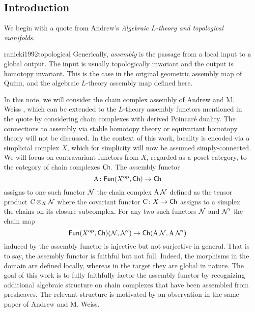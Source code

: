 
\subsection{Introduction}\label{ss:introduction}

We begin with a quote from Andrew's \textit{Algebraic $L$-theory and topological manifolds}.
\begin{displaycquote}{ranicki1992topological}
	Generically, \textit{assembly} is the passage from a local input to a global output.
	The input is usually topologically invariant and the output is homotopy invariant.
	This is the case in the original geometric assembly map of Quinn, and the algebraic $L$-theory assembly map defined here.
\end{displaycquote}
In this note, we will consider the chain complex assembly of Andrew and M. Weiss \cite{ranicki1990assembly}, which can be extended to the $L$-theory assembly functors mentioned in the quote by considering chain complexes with derived Poincar\'e duality.
The connections to assembly via stable homotopy theory \cite{weiss1995asssembly} or equivariant homotopy theory \cite{davis1998assembly} will not be discussed.
In the context of this work, locality is encoded via a simplicial complex $X$, which for simplicity will now be assumed simply-connected.
We will focus on contravariant functors from $X$, regarded as a poset category, to the category of chain complexes $\mathsf{Ch}$.
The assembly functor
\[
\operatorname{A} \colon \mathsf{Fun}(X^{\mathrm{op}}, \mathsf{Ch}) \to \mathsf{Ch}
\]
assigns to one such functor $\mathcal{N}$ the chain complex $\operatorname{A} \mathcal{N}$
defined
as the tensor product $\operatorname{C} \operatorname*{\otimes}_X \mathcal{N}$ where the covariant functor $\operatorname{C} \colon X \to \mathsf{Ch}$ assigns to a simplex the chains on its closure subcomplex.
For any two such functors $\mathcal{N}$ and $\mathcal{N}'$ the chain map
\[
\mathsf{Fun}(X^{\mathrm{op}},\mathsf{Ch})(\mathcal{N},\mathcal{N}') \to \mathsf{Ch}(\operatorname{A} \mathcal{N}, \operatorname{A} \mathcal{N}')
\]
induced by the assembly functor is injective but not surjective in general.
That is to say, the assembly functor is faithful but not full.
Indeed, the morphisms in the domain are defined locally, whereas in the target they are global in nature.
The goal of this work is to fully faithfully factor the assembly functor by recognizing additional algebraic structure on chain complexes that have been assembled from presheaves.
The relevant structure is motivated by an observation in the same paper of Andrew and M. Weiss.
